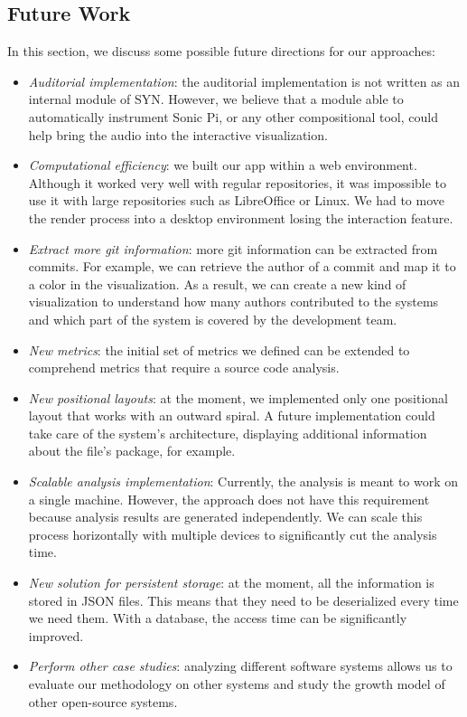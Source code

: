 \subsection{Future Work}
In this section, we discuss some possible future directions for our approaches:
\begin{itemize}
    \item \textit{Auditorial implementation}: the auditorial implementation is not written as an internal module of SYN. However, we believe that a module able to automatically instrument Sonic Pi, or any other compositional tool, could help bring the audio into the interactive visualization. 
    \item \textit{Computational efficiency}: we built our app within a web environment. Although it worked very well with regular repositories, it was impossible to use it with large repositories such as LibreOffice or Linux. We had to move the render process into a desktop environment losing the interaction feature.
    \item \textit{Extract more git information}: more git information can be extracted from commits. For example, we can retrieve the author of a commit and map it to a color in the visualization. As a result, we can create a new kind of visualization to understand how many authors contributed to the systems and which part of the system is covered by the development team. 
    \item \textit{New metrics}: the initial set of metrics we defined can be extended to comprehend metrics that require a source code analysis.
    \item \textit{New positional layouts}: at the moment, we implemented only one positional layout that works with an outward spiral. A future implementation could take care of the system's architecture, displaying additional information about the file's package, for example.
    \item \textit{Scalable analysis implementation}: Currently, the analysis is meant to work on a single machine. However, the approach does not have this requirement because analysis results are generated independently. We can scale this process horizontally with multiple devices to significantly cut the analysis time. 
    \item \textit{New solution for persistent storage}: at the moment, all the information is stored in JSON files. This means that they need to be deserialized every time we need them. With a database, the access time can be significantly improved.
    \item \textit{Perform other case studies}: analyzing different software systems allows us to evaluate our methodology on other systems and study the growth model of other open-source systems. 
\end{itemize}

